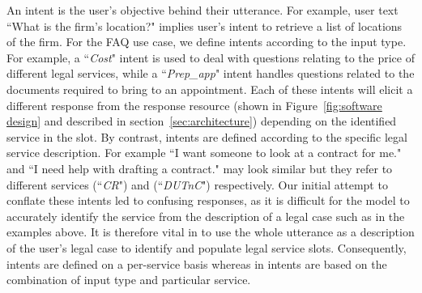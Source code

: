 \documentclass[runningheads]{llncs}
\begin{document}
An intent is the user's objective behind their utterance. For example, user text ``What is the firm's location?" implies user's intent to retrieve a list of locations of the firm. 
For the FAQ use case, we define intents according to the input type. For example, a ``\textit{Cost}" intent is used to deal with questions relating to the price of different legal services, while a ``\textit{Prep\_app}" intent handles questions related to the documents required to bring to an appointment. Each of these \faq intents will elicit a different response from the response resource (shown in Figure~\ref{fig:software design} and described in section~\ref{sec:architecture}) depending on the identified service in the slot.
By contrast, \ff intents are defined according to 
the specific legal service description. For example ``I want someone to look at a contract for me." and ``I need help with drafting a contract." may look similar but they refer to different services (``\textit{CR}") and (``\textit{DUTnC}") respectively.
Our initial attempt to conflate these intents led to confusing responses, as it is difficult for the model to accurately identify the service from the description of a legal case such as in the examples above. It is therefore vital in \ff to use the whole utterance as a description of the user's legal case to identify and populate legal service slots. 
Consequently, \ff intents are defined on a per-service basis whereas in \faq intents are %
based on the combination of input type and particular service. 
\end{document}
